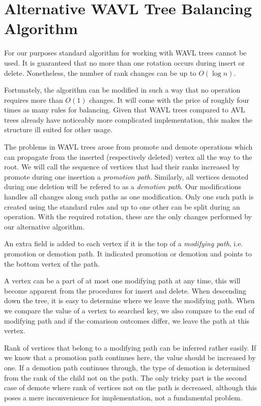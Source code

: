 \section{Alternative WAVL Tree Balancing Algorithm}

For our purposes standard algorithm for working with WAVL trees cannot be used. It is guaranteed that no more than one rotation occurs during insert or delete. Nonetheless, the number of rank changes can be up to $O(\log n)$. 

Fortunately, the algorithm can be modified in such a way that no operation requires more than $O(1)$ changes. It will come with the price of roughly four times as many rules for balancing. Given that WAVL trees compared to AVL trees already have noticeably more complicated implementation, this makes the structure ill suited for other usage. 

The problems in WAVL trees arose from promote and demote operations which can propagate from the inserted (respectively deleted) vertex all the way to the root. We will call the sequence of vertices that had their ranks increased by promote during one insertion a {\em promotion path}. Similarly, all vertices demoted during one deletion will be refered to as a {\em demotion path}. Our modifications handles all changes along such paths as one modification. Only one such path is created using the standard rules and up to one other can be split during an operation. With the required rotation, these are the only changes performed by our alternative algorithm.


An extra field is added to each vertex if it is the top of a {\em modifying path}, i.e. promotion or demotion path. It indicated promotion or demotion and points to the bottom vertex of the path.

A vertex can be a part of at most one modifying path at any time, this will become apparent from the procedures for insert and delete. When descending down the tree, it is easy to determine where we leave the modifying path. When we compare the value of a vertex to searched key, we also compare to the end of modifying path and if the comarison outcomes differ, we leave the path at this vertex. 

Rank of vertices that belong to a modifying path can be inferred rather easily. If we know that a promotion path continues here, the value should be increased by one. If a demotion path continues through, the type of demotion is determined from the rank of the child not on the path. The only tricky part is the second case of demote where rank of vertices not on the path is decreased, although this poses a mere inconvenience for implementation, not a fundamental problem.

